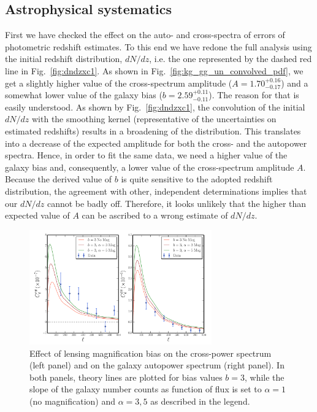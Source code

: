 \subsection{Astrophysical systematics}

First we have checked the effect on the auto- and cross-spectra of errors of photometric redshift estimates. To this end we have redone the full analysis using the initial redshift distribution, $dN/dz$, i.e. the one represented by the dashed red line in Fig.~\eqref{fig:dndzxc1}. As shown in Fig.~\eqref{fig:kg_gg_un_convolved_pdf}, we get a slightly higher value of the cross-spectrum amplitude ($A=1.70^{+0.16}_{-0.17}$) and a somewhat lower value of the galaxy bias ($b=2.59^{+0.11}_{-0.11}$). The reason for that is easily understood. As shown by Fig.~\eqref{fig:dndzxc1}, the convolution of the initial $dN/dz$ with the smoothing kernel (representative of the uncertainties on estimated redshifts) results in a broadening of the distribution. This translates into a decrease of the expected amplitude for both the cross- and the autopower spectra. Hence, in order to fit the same data, we need a higher value of the galaxy bias and, consequently,  a lower value of the cross-spectrum amplitude $A$. Because the derived value of $b$ is quite sensitive to the adopted redshift distribution, the agreement with other, independent determinations implies that our $dN/dz$ cannot be badly off. Therefore, it looks unlikely that the higher than expected value of $A$ can be ascribed to a wrong estimate of $dN/dz$.

\begin{figure} %
\centering %
\includegraphics[width=0.7\textwidth]{Chapter3/Images/f17}
\caption{Effect of lensing magnification bias on the cross-power spectrum (left panel) and on the galaxy autopower spectrum (right panel).  In both panels, theory lines are plotted for bias values $b=3$, while the slope of the galaxy number counts as function of flux is set to $\alpha=1$ (no magnification) and $\alpha=3,5$ as described in the legend. \label{fig:kg_gg_mag_bias}}
\end{figure}

